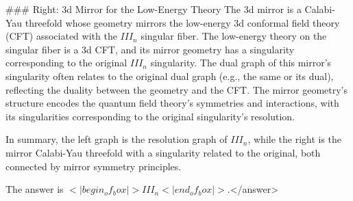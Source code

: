 ### Right: 3d Mirror for the Low-Energy Theory  
The 3d mirror is a Calabi-Yau threefold whose geometry mirrors the low-energy 3d conformal field theory (CFT) associated with the \( III_n \) singular fiber. The low-energy theory on the singular fiber is a 3d CFT, and its mirror geometry has a singularity corresponding to the original \( III_n \) singularity. The dual graph of this mirror’s singularity often relates to the original dual graph (e.g., the same or its dual), reflecting the duality between the geometry and the CFT. The mirror geometry’s structure encodes the quantum field theory’s symmetries and interactions, with its singularities corresponding to the original singularity’s resolution.  

In summary, the left graph is the resolution graph of \( III_n \), while the right is the mirror Calabi-Yau threefold with a singularity related to the original, both connected by mirror symmetry principles.  

The answer is \(<|begin_of_box|>III_n<|end_of_box|>\).</answer>